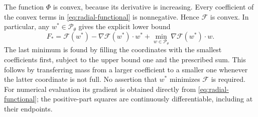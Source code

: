 The function $\Phi$ is convex, because its derivative is increasing.
Every coefficient of the convex terms in \eqref{eq:radial-functional}
is nonnegative. Hence $\mathcal F$ is convex. In particular, any
$w^*\in\mathcal P_\theta$ gives the explicit lower bound
\begin{equation}\label{eq:radial-supporting-plane}
 F_*=\mathcal F(w^*)-\nabla\mathcal F(w^*)\cdot w^*
                 +\min_{w\in\mathcal P_\theta}
                         \nabla\mathcal F(w^*)\cdot w.
\end{equation}
The last minimum is found by filling the coordinates with the smallest
coefficients first, subject to the upper bound one and the prescribed
sum. This follows by transferring mass from a larger coefficient to a
smaller one whenever the latter coordinate is not full. No assertion
that $w^*$ minimizes $\mathcal F$ is required.
For numerical evaluation its gradient is obtained directly from
\eqref{eq:radial-functional}; the positive-part squares are continuously
differentiable, including at their endpoints.
